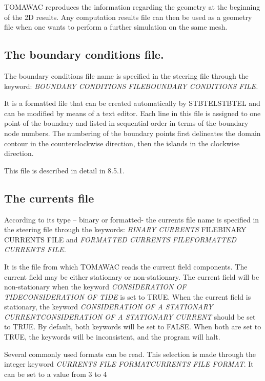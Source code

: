  TOMAWAC reproduces the information regarding the geometry at the beginning of the 2D results. Any computation results file can then be used as a geometry file when one wants to perform a further simulation on the same mesh.


\subsection{ The boundary conditions file. }

 The boundary conditions file name is specified in the steering file through the keyword: \textit{BOUNDARY CONDITIONS FILEBOUNDARY CONDITIONS FILE.}

 It is a formatted file that can be created automatically by STBTELSTBTEL and can be modified by means of a text editor. Each line in this file is assigned to one point of the boundary and listed in sequential order in terms of the boundary node numbers. The numbering of the boundary points first delineates the domain contour in the counterclockwise direction, then the islands in the clockwise direction.

 This file is described in detail in 8.5.1.


\subsection{ The currents file}

 According to its type -- binary or formatted- the currents file name is specified in the steering file through the keywords: \textit{BINARY CURRENTS }FILEBINARY CURRENTS FILE and\textit{ FORMATTED CURRENTS FILEFORMATTED CURRENTS FILE.}

 It is the file from which TOMAWAC reads the current field components. The current field may be either stationary or non-stationary. The current field will be non-stationary when the keyword \textit{CONSIDERATION OF TIDECONSIDERATION OF TIDE }is set to TRUE. When the current field is stationary, the keyword \textit{CONSIDERATION OF A STATIONARY CURRENTCONSIDERATION OF A STATIONARY CURRENT} should be set to TRUE. By default, both keywords will be set to FALSE. When both are set to TRUE, the keywords will be inconsistent, and the program will halt.

 Several commonly used formats can be read. This selection is made through the integer keyword \textit{CURRENTS FILE FORMATCURRENTS FILE FORMAT}. It can\textit{ }be set to a value from 3 to 4


